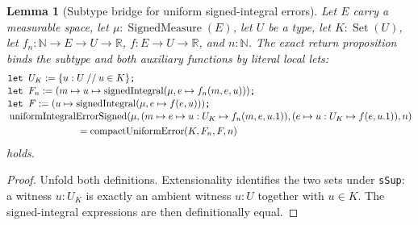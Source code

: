 \documentclass[9pt]{extarticle}
\newtheorem{lemma}{Lemma}[section]
\theoremstyle{definition}
\theoremstyle{remark}
\newcommand{\R}{\mathbb R}
\newcommand{\N}{\mathbb N}
\begin{document}
\begin{lemma}[Subtype bridge for uniform signed-integral errors]
\label{lem:subtype-uniform-error-bridge}
Let $E$ carry a measurable space, let $\mu:\operatorname{SignedMeasure}(E)$,
let $U$ be a type, let $K:\operatorname{Set}(U)$, let
$f_n:\N\to E\to U\to\R$, $f:E\to U\to\R$, and $n:\N$.  The exact return
proposition binds the subtype and both auxiliary functions by literal local
lets:
\begin{align*}
&\texttt{let }U_K:=\{u:U\mathbin{//}u\in K\}\texttt{; }\\[-2pt]
&\texttt{let }F_n:=
 (m\mapsto u\mapsto\operatorname{signedIntegral}
   (\mu,e\mapsto f_n(m,e,u)))\texttt{; }\\[-2pt]
&\texttt{let }F:=
 (u\mapsto\operatorname{signedIntegral}(\mu,e\mapsto f(e,u)))\texttt{; }\\[-2pt]
&\operatorname{uniformIntegralErrorSigned}\!\left(
 \mu,(m\mapsto e\mapsto u:U_K\mapsto f_n(m,e,u.1)),
      (e\mapsto u:U_K\mapsto f(e,u.1)),n\right)\\
&\hspace{25mm}
 =\operatorname{compactUniformError}(K,F_n,F,n)
\end{align*}
holds.
\end{lemma}

\begin{proof}
Unfold both definitions.  Extensionality identifies the two sets under
\texttt{sSup}: a witness $u:U_K$ is exactly an ambient witness $u:U$
together with $u\in K$.  The signed-integral expressions are then
definitionally equal.
\end{proof}
\end{document}
